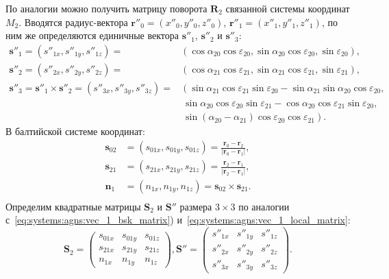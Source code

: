 \documentclass[../main.tex]{subfiles}
\begin{document}
По аналогии можно получить матрицу поворота $\mathbf{R}_2$ связанной системы координат $M_2$. Вводятся радиус-вектора $\mathbf{r}''_0 = \left(x''_0, y''_0, z''_0\right)$,
$\mathbf{r}''_1 = \left(x''_1, y''_1, z''_1\right)$, по ним же определяются единичные вектора
$\mathbf{s}''_1$, $\mathbf{s}''_2$ и $\mathbf{s}''_3$:
\begin{equation*}
    \begin{split}
    \mathbf{s}''_1 = \left(s''_{1x}, s''_{1y}, s''_{1z}\right) =  &\left(\cos\alpha_{20} \cos\varepsilon_{20}, \sin\alpha_{20}\cos\varepsilon_{20}, \sin\varepsilon_{20}\right),\\
    \mathbf{s}''_2 = \left(s''_{2x}, s''_{2y}, s''_{2z}\right) = &\left(\cos\alpha_{21} \cos\varepsilon_{21}, \sin\alpha_{21}\cos\varepsilon_{21}, \sin\varepsilon_{21}\right),\\
    \mathbf{s}''_3 = \mathbf{s}''_1 \times \mathbf{s}''_2 = \left(s''_{3x}, s''_{3y}, s''_{3z}\right) =  &\left(\sin\alpha_{21}\cos\varepsilon_{21}\sin\varepsilon_{20} - \sin\alpha_{21}\sin\alpha_{20}\cos\varepsilon_{20},\right.\\
    &\ \sin\alpha_{20}\cos\varepsilon_{20}\sin\varepsilon_{21} - \cos\alpha_{20}\cos\varepsilon_{21}\sin\varepsilon_{20},\\
    &\ \left.\sin\left(\alpha_{20} - \alpha_{21}\right)\cos\varepsilon_{20}\cos\varepsilon_{21}\right).
    \end{split}
\end{equation*}
В балтийской системе координат:
\begin{equation*}
    \begin{split}
        \mathbf{s}_{02} &= \left(s_{01x}, s_{01y}, s_{01z}\right) = \frac{\mathbf{r}_0 - \mathbf{r}_2}{|\mathbf{r}_0 - \mathbf{r}_1|},\\
        \mathbf{s}_{21} &= \left(s_{21x}, s_{21y}, s_{21z}\right) = \frac{\mathbf{r}_2 - \mathbf{r}_1}{|\mathbf{r}_2 - \mathbf{r}_1|},\\
        \mathbf{n}_1 &= \left(n_{1x}, n_{1y}, n_{1z}\right) = \mathbf{s}_{02} \times \mathbf{s}_{21}.\\
    \end{split}
\end{equation*}
Определим квадратные матрицы $\mathbf{S}_2$ и $\mathbf{S}''$ размера $3 \times 3$ по аналогии с~\eqref{eq:systems:agns:vec_1_bsk_matrix}) и~\eqref{eq:systems:agns:vec_1_local_matrix}:
\begin{equation*}
    \mathbf{S}_2 =
    \left(
        \begin{matrix}
            s_{01x} & s_{01y} & s_{01z} \\
            s_{21x} & s_{21y} & s_{21z} \\
            n_{1x} & n_{1y} & n_{1z}
        \end{matrix}
    \right),
    \mathbf{S}'' =
    \left(
        \begin{matrix}
            s''_{1x} & s''_{1y} & s''_{1z} \\
            s''_{2x} & s''_{2y} & s''_{2z} \\
            s''_{3x} & s''_{3y} & s''_{3z}
        \end{matrix}
    \right).
\end{equation*}
\end{document}
